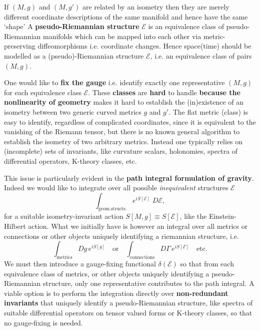 \documentclass[../geometry_main.tex]{subfiles}
\begin{document}
\begin{mytheorem}
%
If \((M,g)\) and \((M,g')\) are related by an isometry then they are merely different coordinate descriptions of the same manifold and hence have the same `shape'
%
A \textbf{pseudo-Riemannian structure} \(\mathcal{E}\) is an equivalence class of pseudo-Riemannian manifolds which can be mapped into each other via metric-preserving diffeomorphisms i.e. coordinate changes.
Hence space(time) should be modelled as a (pseudo)-Riemannian structure \(\mathcal{E}\), i.e. an equivalence class of pairs \((M,g)\).

One would like to \textbf{fix the gauge} i.e. identify exactly one representative \((M,g)\) for each equivalence class \(\mathcal{E}\).
These \textbf{classes} are \textbf{hard} to handle \textbf{because the nonlinearity of geometry} makes it hard to establish the (in)existence of an isometry between two generic curved metrics \(g\) and \(g'\).
The flat metric (class) is easy to identify, regardless of complicated coordinates, since it is equivalent to the vanishing of the Riemann tensor, but there is no known general algorithm to establish the isometry of two arbitrary metrics.
Instead one typically relies on (incomplete) sets of invariants, like curvature scalars, holonomies, spectra of differential operators, K-theory classes, etc.

This issue is particularly evident in the \textbf{path integral formulation of gravity}.
Indeed we would like to integrate over all possible \emph{inequivalent} structures \(\mathcal{E}\)
\begin{equation}
    \int_{\mathrm{geom. structs.}} e^{i S[\mathcal{E}]} \;D\mathcal{E},
\end{equation}
for a suitable isometry-invariant action $S[M,g]\equiv S[\mathcal{E}]$, like the Einstein-Hilbert action.
%
What we initially have is however an integral over all metrics or connections or other objects uniquely identifying a riemannian structure, i.e.
\begin{equation}
    \int_{\mathrm{metrics}} \!\!Dg\, e^{i S[g]} 
    \quad \text{or} \quad
    \int_{\mathrm{connections}}\!\!D\Gamma\,  e^{i S[\Gamma]}\quad \text{etc.}
\end{equation}
%
We must then introduce a gauge-fixing functional \(\delta(\mathcal{E})\) so that from each equivalence class of metrics, or other objects uniquely identifying a pseudo-Riemannian structure, only one representative contributes to the path integral.
%
A viable option is to perform the integration directly over \textbf{non-redundant invariants} that uniquely identify a pseudo-Riemannian structure, like spectra of suitable differential operators on tensor valued forms or K-theory classes, so that no gauge-fixing is needed.


\end{mytheorem}
\end{document}
